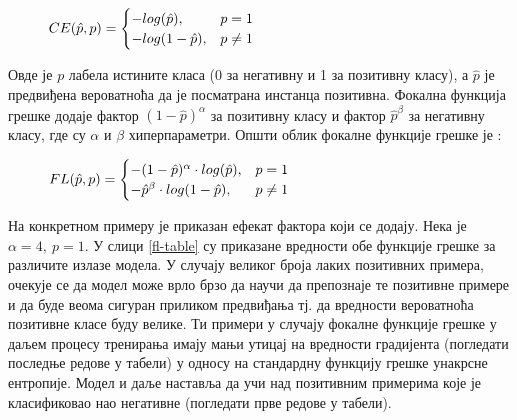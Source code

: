 \documentclass[11pt,oneside]{memoir}
\begin{document}
\begin{figure}[H]
  \centering
  $ CE(\hat{p}, p) =
  \begin{cases}
    \centering
    -log(\hat{p}), & p = 1 \\
    -log(1-\hat{p}), & p \neq 1
  \end{cases}
  $
\end{figure}

Овде је $p$ лабела истините класа (0 за негативну и 1 за позитивну класу), а $\hat{p}$ је предвиђена вероватноћа да је посматрана инстанца позитивна.
Фокална функција грешке додаје фактор $(1 - \hat{p})^{\alpha}$ за позитивну класу и фактор $\hat{p}^{\beta}$
за негативну класу, где су $\alpha$ и $\beta$ хиперпараметри. Општи облик фокалне функције грешке је \cite{focal_loss}:

\begin{figure}[H]
  \centering
  $ FL(\hat{p}, p) =
  \begin{cases}
    \centering
    -(1 - \hat{p})^{\alpha}\cdot log(\hat{p}) , & p = 1 \\
    -\hat{p}^{\beta}\cdot log(1-\hat{p}), & p \neq 1
  \end{cases}
  $
\end{figure}

На конкретном примеру је приказан ефекат фактора који се додају. Нека је $\alpha = 4,\ p = 1$. У слици \ref{fl-table} су приказане
вредности обе функције грешке за различите излазе модела. У случају великог броја лаких позитивних примера, очекује се да модел 
може врло брзо да научи да препознаје те позитивне примере и да буде веома сигуран приликом предвиђања тј. да вредности 
вероватноћа позитивне класе буду велике. Ти примери у случају фокалне функције грешке у даљем процесу тренирања имају мањи утицај
на вредности градијента (погледати последње редове у табели) у односу на стандардну функцију грешке унакрсне ентропије. 
Модел и даље наставља да учи над позитивним примерима које је класификовао нао негативне (погледати прве редове у табели).
\end{document}
